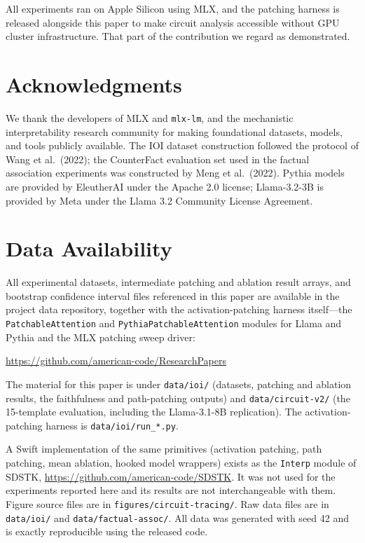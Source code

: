\documentclass[11pt,a4paper]{article}
\begin{document}
All experiments ran on Apple Silicon using MLX, and the patching harness is
released alongside this paper to make circuit analysis accessible without GPU cluster
infrastructure. That part of the contribution we regard as demonstrated.

\section*{Acknowledgments}

We thank the developers of MLX and \texttt{mlx-lm}, and the mechanistic
interpretability research community for making
foundational datasets, models, and tools publicly available. The IOI dataset
construction followed the protocol of Wang et al.\ (2022); the CounterFact evaluation
set used in the factual association experiments was constructed by Meng et al.\ (2022).
Pythia models are provided by EleutherAI under the Apache 2.0 license; Llama-3.2-3B
is provided by Meta under the Llama 3.2 Community License Agreement.

\section*{Data Availability}

All experimental datasets, intermediate patching and ablation result arrays, and
bootstrap confidence interval files referenced in this paper are available in the
project data repository, together with the activation-patching harness itself---the
\texttt{PatchableAttention} and \texttt{PythiaPatchableAttention} modules for Llama and
Pythia and the MLX patching sweep driver:
\begin{center}
  \url{https://github.com/american-code/ResearchPapers}
\end{center}
The material for this paper is under \texttt{data/ioi/} (datasets, patching and
ablation results, the faithfulness and path-patching outputs) and
\texttt{data/circuit-v2/} (the 15-template evaluation, including the Llama-3.1-8B
replication). The activation-patching harness is \texttt{data/ioi/run\_*.py}.
\begin{center}
\end{center}
A Swift implementation of the same primitives (activation patching, path patching, mean
ablation, hooked model wrappers) exists as the \texttt{Interp} module of SDSTK,
\url{https://github.com/american-code/SDSTK}. It was not used for the experiments
reported here and its results are not interchangeable with them.
Figure source files are in \texttt{figures/circuit-tracing/}. Raw data files are in
\texttt{data/ioi/} and \texttt{data/factual-assoc/}. All data was generated with seed
42 and is exactly reproducible using the released code.
\end{document}
